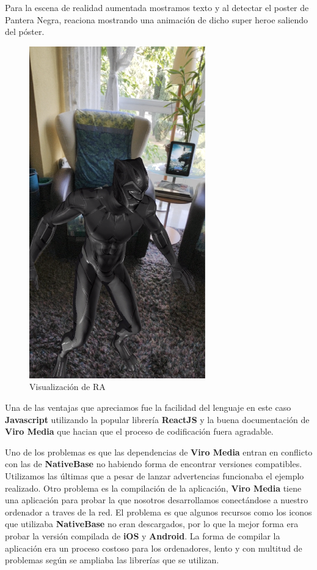 \begin{flushleft}
Para la escena de realidad aumentada mostramos texto y al detectar el poster de Pantera Negra,
 reaciona mostrando una animación de dicho super heroe saliendo del póster.
\end{flushleft}
 
\begin{figure}[H]
    \centering
    \includegraphics[width=3in]{figures/chapter-3/viromedia/blackpanther.png}
    \caption{Visualización de RA}
\end{figure}

\begin{flushleft}
Una de las ventajas que apreciamos fue la facilidad del lenguaje en este caso \textbf{Javascript}
 utilizando la popular librería \textbf{ReactJS} y la buena documentación de \textbf{Viro Media}
 que hacian que el proceso de codificación fuera agradable.
\end{flushleft}
\begin{flushleft}
Uno de los problemas es que las dependencias de \textbf{Viro Media} entran en conflicto con las de \textbf{NativeBase}
 no habiendo forma de encontrar versiones compatibles. Utilizamos las últimas que a pesar de lanzar
 advertencias funcionaba el ejemplo realizado.
Otro problema es la compilación de la aplicación, \textbf{Viro Media} tiene una aplicación para probar la
 que nosotros desarrollamos conectándose a nuestro ordenador a traves de la red. El problema es
 que algunos recursos como los iconos que utilizaba \textbf{NativeBase} no eran descargados, por lo que la
 mejor forma era probar la versión compilada de \textbf{iOS} y \textbf{Android}. La forma de compilar
 la aplicación era un proceso costoso para los ordenadores, lento y con multitud de problemas según
 se ampliaba las librerías que se utilizan.
\end{flushleft}


